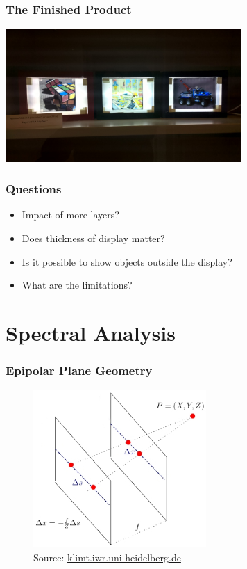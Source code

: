 \documentclass[12pt, compress]{beamer}
\begin{document}
\begin{frame}[fragile]
	\frametitle{The Finished Product}
	\begin{center}
		\includegraphics[width=9cm]{images/all_displays_on}
	\end{center}
\end{frame}

\begin{frame}[fragile]
	\frametitle{Questions}
	
	\begin{itemize}
		\item Impact of more layers?
		\item Does thickness of display matter?
		\item Is it possible to show objects outside the display?
		\item What are the limitations?
	\end{itemize}
\end{frame}

\section{Spectral Analysis}

\begin{frame}[fragile]
	\frametitle{Epipolar Plane Geometry}
	\begin{figure}
		\captionsetup{font=scriptsize}
		\includegraphics[height = 6cm]{images/lf_geometry_modified.jpg}
		\caption*{Source: \href{http://klimt.iwr.uni-heidelberg.de/HCI/Research/LightField/images/lf_geometry.jpg}{klimt.iwr.uni-heidelberg.de}}
	\end{figure}
\end{frame}
\end{document}
